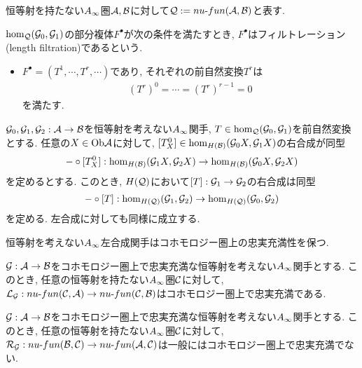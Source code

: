 \documentclass[uplatex, a4paper, 14Q, dvipdfmx]{jsarticle}
\begin{document}
恒等射を持たない$A_{\infty}$圏$\mathcal{A}, \mathcal{B}$に対して$\mathcal{Q} := nu \text{-} fun (\mathcal{A}, \mathcal{B})$と表す.

\begin{definition}[フィルトレーション]
  $\hom_{\mathcal{Q}}(\mathcal{G}_0,\mathcal{G}_1)$の部分複体$F^\bullet$が次の条件を満たすとき, $F^\bullet$はフィルトレーション(length filtration)であるという.
  \begin{itemize}
    \item $F^\bullet = (T^1,\cdots,T^r,\cdots)$であり, それぞれの前自然変換$T^r$は
    \begin{align*}
      (T^r)^0 = \cdots = (T^r)^{r-1} = 0
    \end{align*}
    を満たす. 
  \end{itemize}
\end{definition}

\begin{lemma} \label{prop_circ_T_is_isom}
  $\mathcal{G}_0,\mathcal{G}_1,\mathcal{G}_2 : \mathcal{A} \to \mathcal{B}$を恒等射を考えない$A_{\infty}$関手, $T \in \hom_{\mathcal{Q}}(\mathcal{G}_0,\mathcal{G}_1)$を前自然変換とする. 
  任意の$X \in \mathrm{Ob}\mathcal{A}$に対して, $[T^0_X] \in \hom_{H(\mathcal{B})}(\mathcal{G}_0X,\mathcal{G}_1X)$の右合成が同型
  \begin{align*}
    - \circ [T^0_X] : \hom_{H(\mathcal{B})}(\mathcal{G}_1X,\mathcal{G}_2X) \to \hom_{H(\mathcal{B})}(\mathcal{G}_0X,\mathcal{G}_2X)
  \end{align*}
  を定めるとする. 
  このとき, $H(\mathcal{Q})$において$[T] : \mathcal{G}_1 \to \mathcal{G}_2$の右合成は同型
  \begin{align*}
    - \circ [T] : \hom_{H(\mathcal{Q})}(\mathcal{G}_1,\mathcal{G}_2) \to \hom_{H(\mathcal{Q})}(\mathcal{G}_0,\mathcal{G}_2)
  \end{align*}
  を定める.
  左合成に対しても同様に成立する. 
\end{lemma}

恒等射を考えない$A_{\infty}$左合成関手はコホモロジー圏上の忠実充満性を保つ. 

\begin{lemma} \label{prop_LG_is_also_cohomologically_fully_faithful}
  $\mathcal{G} :\mathcal{A} \to \mathcal{B}$をコホモロジー圏上で忠実充満な恒等射を考えない$A_{\infty}$関手とする. 
  このとき, 任意の恒等射を持たない$A_{\infty}$圏$\mathcal{C}$に対して, $\mathcal{L}_{\mathcal{G}} : nu \text{-} fun (\mathcal{C}, \mathcal{A}) \to nu \text{-} fun (\mathcal{C}, \mathcal{B})$はコホモロジー圏上で忠実充満である. 
\end{lemma}

\begin{remark} 
  $\mathcal{G} :\mathcal{A} \to \mathcal{B}$をコホモロジー圏上で忠実充満な恒等射を考えない$A_{\infty}$関手とする. 
  このとき, 任意の恒等射を持たない$A_{\infty}$圏$\mathcal{C}$に対して, $\mathcal{R}_{\mathcal{G}} : nu \text{-} fun (\mathcal{B}, \mathcal{C}) \to nu \text{-} fun (\mathcal{A}, \mathcal{C})$は一般にはコホモロジー圏上で忠実充満でない.
\end{remark}
\end{document}
